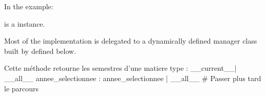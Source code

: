 \documentclass[letterpaper,10pt,french]{sphinxmanual}
\begin{document}
\begin{fulllineitems}
\begin{fulllineitems}
\sphinxAtStartPar
In the example:

\begin{sphinxVerbatim}[commandchars=\\\{\}]
 
       
\end{sphinxVerbatim}

\sphinxAtStartPar
{} is a  instance.

\sphinxAtStartPar
Most of the implementation is delegated to a dynamically defined manager
class built by  defined below.

\end{fulllineitems}


\begin{fulllineitems}
\label{\detokenize{main/model:main.models.Matiere.get_etudiant_semestre}}
\pysigstartsignatures
{}
\pysigstopsignatures
\end{fulllineitems}


\begin{fulllineitems}
\label{\detokenize{main/model:main.models.Matiere.get_etudiants_en_rattrapage}}
\pysigstartsignatures
{}
\pysigstopsignatures
\end{fulllineitems}


\begin{fulllineitems}
\label{\detokenize{main/model:main.models.Matiere.get_semestres}}
\pysigstartsignatures
{}
\pysigstopsignatures
\sphinxAtStartPar
Cette méthode retourne les semestres d’une matiere
type : \_\_current\_\_| \_\_all\_\_
annee\_selectionnee : annee\_selectionnee | \_\_all\_\_
\# Passer plus tard le parcours


\end{fulllineitems}
\end{fulllineitems}
\end{document}
